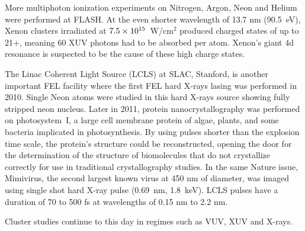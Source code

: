 More multiphoton
ionization experiments on Nitrogen, Argon, Neon and Helium were performed at
FLASH.
At the even shorter wavelength of 13.7 nm (90.5~eV), Xenon clusters irradiated at
$\ten{7.5}{15}$~W/cm$^2$ produced charged states of up to 21+\cite{Sorokin2007,Richter2009},
meaning 60 XUV photons had to be absorbed per atom. Xenon's giant 4d
resonance is suspected to be the cause of these high charge states.

The Linac Coherent Light Source (LCLS) at SLAC, Stanford, is another important
FEL facility where the first FEL hard X-rays lasing was
performed in 2010\cite{Emma2010,Schneider2010}. Single Neon atoms were studied in
this hard X-rays source\cite{Young2010} showing fully stripped neon nucleus.
Later in 2011, protein nanocrystallography was performed \cite{Chapman2011}
on photosystem~I, a large cell membrane protein of algae, plants, and some
bacteria implicated in photosynthesis. By using pulses shorter
than the explosion time scale, the protein's structure could be reconstructed,
opening the door for the determination of the structure of biomolecules that
do not crystallize correctly for use in traditional crystallography studies.
In the same Nature issue, Mimivirus, the second largest known virus at 450 nm
of diameter, was imaged using single shot hard X-ray pulse (0.69~nm,
1.8~keV)\cite{Seibert2011}. LCLS pulses have a duration of 70 to 500 fs at
wavelengths of 0.15 nm to 2.2 nm\cite{Pellegrini2011}.

Cluster studies continue to this day in regimes such as VUV\cite{Arbeiter2011},
XUV\cite{Murphy2008a,Murphy2008b,Krikunova2012} and X-rays\cite{Ziaja2009b}.

